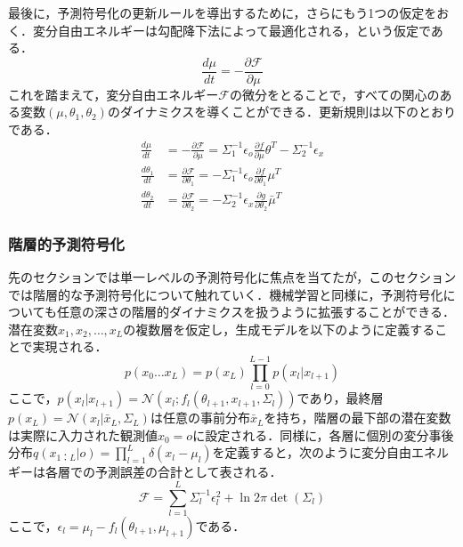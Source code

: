 \documentclass[a4paper, titlepage]{jsarticle}
\begin{document}
\par
最後に，予測符号化の更新ルールを導出するために，さらにもう1つの仮定をおく．変分自由エネルギーは勾配降下法によって最適化される，という仮定である．
\begin{equation}
   \frac{d\mu}{dt}=-\frac{\partial\mathcal{F}}{\partial\mu}
\end{equation}
これを踏まえて，変分自由エネルギー$\mathcal{F}$の微分をとることで，すべての関心のある変数$(\mu,\theta_1,\theta_2)$のダイナミクスを導くことができる．更新規則は以下のとおりである．
\begin{align}
   \frac{d\mu}{dt}&=-\frac{\partial\mathcal{F}}{\partial\mu}=\Sigma_1^{-1}\epsilon_o\frac{\partial f}{\partial\mu}\theta^T-\Sigma_2^{-1}\epsilon_x \\
   \frac{d\theta_1}{dt}&=\frac{\partial\mathcal{F}}{\partial\theta_1}=-\Sigma_1^{-1}\epsilon_o\frac{\partial f}{\partial\theta_1}\mu^T \\
   \frac{d\theta_2}{dt}&=\frac{\partial\mathcal{F}}{\partial\theta_2}=-\Sigma_2^{-1}\epsilon_x\frac{\partial g}{\partial\theta_2}\bar{\mu}^T
\end{align}
\subsubsection{階層的予測符号化}
先のセクションでは単一レベルの予測符号化に焦点を当てたが，このセクションでは階層的な予測符号化について触れていく．機械学習と同様に，予測符号化についても任意の深さの階層的ダイナミクスを扱うように拡張することができる．潜在変数$x_1,x_2,\dots,x_L$の複数層を仮定し，生成モデルを以下のように定義することで実現される．
\begin{equation}
   p(x_0\dots x_L)=p(x_L)\prod_{l=0}^{L-1}p(x_l|x_{l+1})
\end{equation}
ここで，\;$p(x_l|x_{l+1})=\mathcal{N}(x_l;f_l(\theta_{l+1},x_{l+1},\Sigma_l))$\;であり，最終層\;$p(x_L)=\mathcal{N}(x_l|\bar{x}_L,\Sigma_L)$\;は任意の事前分布$\bar{x}_L$を持ち，階層の最下部の潜在変数は実際に入力された観測値\;$x_0=o$\;に設定される．同様に，各層に個別の変分事後分布\;$q(x_{1：L}|o)=\prod_{l=1}^L\delta(x_l-\mu_l)$\;を定義すると，次のように変分自由エネルギーは各層での予測誤差の合計として表される．
\begin{equation}\label{another_VFE}
   \mathcal{F}=\sum_{l=1}^L\Sigma_l^{-1}\epsilon_l^2+\ln2\pi\det(\Sigma_l)
\end{equation}
ここで，$\epsilon_l=\mu_l-f_l(\theta_{l+1},\mu_{l+1})$\;である．
\end{document}
